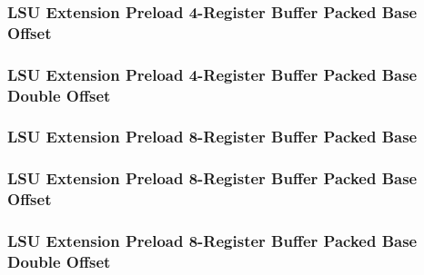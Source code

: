 

\subsubsection[{\small LSU Extension Preload 4-Register Buffer Packed Base Offset}]{LSU Extension Preload 4-Register Buffer Packed Base Offset} \label{sec:format-LSU-XPL4RBB.O}



\subsubsection[{\small LSU Extension Preload 4-Register Buffer Packed Base Double Offset}]{LSU Extension Preload 4-Register Buffer Packed Base Double Offset} \label{sec:format-LSU-XPL4RBB.D}



\subsubsection[{\small LSU Extension Preload 8-Register Buffer Packed Base}]{LSU Extension Preload 8-Register Buffer Packed Base} \label{sec:format-LSU-XPL8RBB}



\subsubsection[{\small LSU Extension Preload 8-Register Buffer Packed Base Offset}]{LSU Extension Preload 8-Register Buffer Packed Base Offset} \label{sec:format-LSU-XPL8RBB.O}



\subsubsection[{\small LSU Extension Preload 8-Register Buffer Packed Base Double Offset}]{LSU Extension Preload 8-Register Buffer Packed Base Double Offset} \label{sec:format-LSU-XPL8RBB.D}

